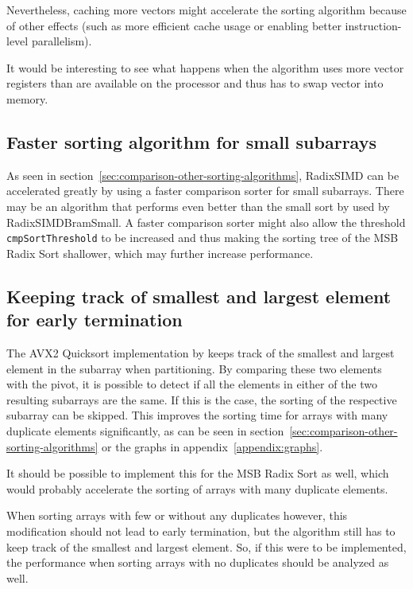 \documentclass[12pt, a4paper, openright, twoside]{tiarbeit}
\begin{document}
Nevertheless, caching more vectors might accelerate the sorting
algorithm because of other effects (such as more efficient cache usage or
enabling better instruction-level parallelism).

It would be interesting to see what happens when the algorithm uses
more vector registers than are available on the processor
and thus has to swap vector into memory.

\subsection{Faster sorting algorithm for small subarrays}

As seen in section~\ref{sec:comparison-other-sorting-algorithms},
RadixSIMD can be accelerated greatly by using a faster comparison
sorter for small subarrays. There may be an algorithm that performs
even better than the small sort by \citet{bramas} used
by RadixSIMDBramSmall.
A faster comparison sorter might also allow the threshold \texttt{cmpSortThreshold}
to be increased and thus making the sorting tree of the MSB Radix Sort
shallower, which may further increase performance.

\subsection{Keeping track of smallest and largest element for early termination}

The AVX2 Quicksort implementation by \citet{blacher} keeps track of the
smallest and largest element in the subarray when partitioning.
By comparing these two elements with the pivot, it is possible to
detect if all the elements in either of the two resulting
subarrays are the same. If this is the case, the sorting
of the respective subarray can be skipped. This improves
the sorting time for arrays with many duplicate elements significantly,
as can be seen in section~\ref{sec:comparison-other-sorting-algorithms}
or the graphs in appendix~\ref{appendix:graphs}.

It should be possible to implement this for the MSB Radix Sort as well, which
would probably accelerate the sorting of arrays with many duplicate
elements.

When sorting arrays with few or without any duplicates however, this modification
should not lead to early termination, but the algorithm still has to
keep track of the smallest and largest element.
So, if this were to be implemented, the performance
when sorting arrays with no duplicates should be analyzed as well.
\end{document}
